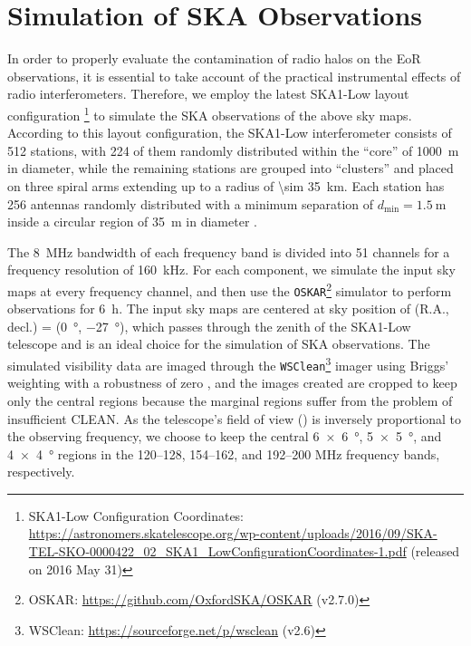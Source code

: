 \documentclass[twocolumn]{aastex62}
\newcommand{\R}[1]{\mathrm{#1}}
\newcommand{\fov}{\text{Fo\!V}}
\begin{document}
\section{Simulation of SKA Observations}
\label{sec:obs-simu}

In order to properly evaluate the contamination of radio halos
on the EoR observations, it is essential to take account of the
practical instrumental effects of radio interferometers.
Therefore, we employ the latest SKA1-Low layout configuration%
\footnote{\raggedright%
  SKA1-Low Configuration Coordinates:
  \url{https://astronomers.skatelescope.org/wp-content/uploads/2016/09/SKA-TEL-SKO-0000422_02_SKA1_LowConfigurationCoordinates-1.pdf}
  (released on 2016 May 31)
}
to simulate the SKA observations of the above sky maps.
According to this layout configuration,
the SKA1-Low interferometer consists of 512 stations, with 224 of them
randomly distributed within the \enquote{core} of \SI{1000}{\meter} in
diameter, while the remaining stations are grouped into \enquote{clusters}
and placed on three spiral arms extending up to a radius of
\SI{\sim 35}{\kilo\meter}.
Each station has 256 antennas randomly distributed with a minimum separation
of $d_{\R{min}} = \SI{1.5}{\meter}$ inside a circular region of
\SI{35}{\meter} in diameter \citep[e.g.,][]{mort2017}.

The \SI{8}{\MHz} bandwidth of each frequency band is divided into 51
channels for a frequency resolution of \SI{160}{\kilo\hertz}.
For each component, we simulate the input sky maps at every frequency
channel, and then use the \texttt{OSKAR}\footnote{%
  OSKAR: \url{https://github.com/OxfordSKA/OSKAR} (v2.7.0)}
simulator \citep{mort2010} to perform observations for \SI{6}{\hour}.
The input sky maps are centered at sky position of
(R.A., decl.\@) = (\SI{0}{\degree}, \SI{-27}{\degree}),
which passes through the zenith of the SKA1-Low telescope and
is an ideal choice for the simulation of SKA observations.
The simulated visibility data are imaged through the
\texttt{WSClean}\footnote{%
  WSClean: \url{https://sourceforge.net/p/wsclean} (v2.6)}
imager \citep{offringa2014} using Briggs' weighting with a
robustness of zero \citep{briggs1995},
and the images created are cropped to keep only the central regions
because the marginal regions suffer from the problem of insufficient
CLEAN.
As the telescope's field of view (\fov) is inversely proportional to
the observing frequency, we choose to keep the central
\SI[product-units=repeat]{6 x 6}{\degree},
\SI[product-units=repeat]{5 x 5}{\degree}, and
\SI[product-units=repeat]{4 x 4}{\degree}
regions in the \numrange{120}{128}, \numrange{154}{162}, and
\numrange{192}{200} \si{\MHz} frequency bands, respectively.
\end{document}

